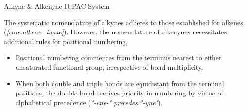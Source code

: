 \documentclass[10pt]{article}
\begin{document}
      \begin{core}{Alkyne \& Alkenyne IUPAC System}

        The systematic nomenclature of alkynes adheres to those established for alkenes (\textit{\autoref{core:alkene_iupac}}). However, the nomenclature of alkenynes necessitates additional rules for positional numbering.

        \begin{itemize}

          \item Positional numbering commences from the terminus nearest to either unsaturated functional group, irrespective of bond multiplicity.


          \item When both double and triple bonds are equidistant from the terminal positions, the double bond receives priority in numbering by virtue of alphabetical precedence (\textit{"-ene-" precedes "-yne"}).


        \end{itemize}

      \end{core}

\end{document}
